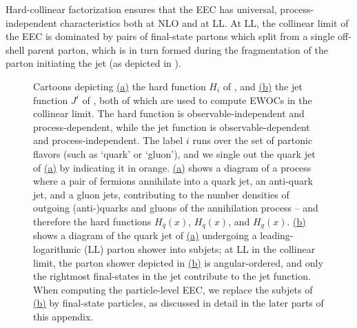    Hard-collinear factorization ensures that the EEC has universal, process-independent characteristics both at NLO and at LL.
    At LL, the collinear limit of the EEC is dominated by pairs of final-state partons which split from a single off-shell parent parton, which is in turn formed during the fragmentation of the parton initiating the jet (as depicted in ).



\begin{figure}[t!]
    \centering
    \caption[Cartoons depicting hard functions and jet functions for EWOCs]{
        Cartoons depicting \hyperref[fig:hardfunction:cartoon]{(a)} the hard function \(H_i\) of , and \hyperref[fig:jetfunction:cartoon]{(b)} the jet function \(J^i\) of , both of which are used to compute EWOCs in the collinear limit.
        The hard function is observable-independent and process-dependent, while the jet function is observable-dependent and process-independent.
        The label \(i\) runs over the set of partonic flavors (such as `quark' or `gluon'), and we single out the quark jet of \hyperref[fig:hardfunction:cartoon]{(a)} by indicating it in orange.
        \hyperref[fig:hardfunction:cartoon]{(a)} shows a diagram of a process where a pair of fermions annihilate into a quark jet, an anti-quark jet, and a gluon jets, contributing to the number densities of outgoing (anti-)quarks and gluons of the annihilation process -- and therefore the hard functions \(H_{\overline{q}}(x)\), \(H_q(x)\), and \(H_g(x)\).
        \hyperref[fig:jetfunction:cartoon]{(b)} shows a diagram of the quark jet of \hyperref[fig:hardfunction:cartoon]{(a)} undergoing a leading-logarithmic (LL) parton shower into subjets;
        at LL in the collinear limit, the parton shower depicted in \hyperref[fig:jetfunction:cartoon]{(b)} is angular-ordered, and only the rightmost final-states in the jet contribute to the jet function.
        When computing the particle-level EEC, we replace the subjets of \hyperref[fig:jetfunction:cartoon]{(b)} by final-state particles, as discussed in detail in the later parts of this appendix.
    }
    \label{fig:EWOCs:cartoon:factorization}
\end{figure}


